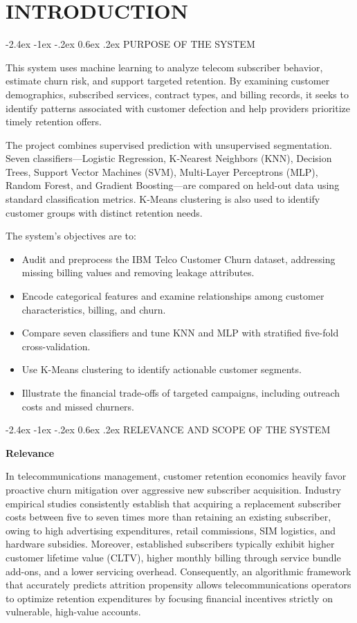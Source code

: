 \documentclass[12pt,oneside]{report}
\makeatletter
\renewcommand{\section}{\@startsection{section}{1}{\z@}%
  {-2.4ex \@plus -1ex \@minus -.2ex}%
  {0.6ex \@plus .2ex}%
  {\normalfont\large\bfseries}}
\newcommand{\chapterpage}[1]{\chapter{#1}}
\makeatother
\begin{document}
\setcounter{page}{1}

\chapterpage{INTRODUCTION}
\section{PURPOSE OF THE SYSTEM}

This system uses machine learning to analyze telecom subscriber behavior, estimate churn risk, and support targeted retention. By examining customer demographics, subscribed services, contract types, and billing records, it seeks to identify patterns associated with customer defection and help providers prioritize timely retention offers.

The project combines supervised prediction with unsupervised segmentation. Seven classifiers---Logistic Regression, K-Nearest Neighbors (KNN), Decision Trees, Support Vector Machines (SVM), Multi-Layer Perceptrons (MLP), Random Forest, and Gradient Boosting---are compared on held-out data using standard classification metrics. K-Means clustering is also used to identify customer groups with distinct retention needs.

The system's objectives are to:
\begin{itemize}
    \item Audit and preprocess the IBM Telco Customer Churn dataset, addressing missing billing values and removing leakage attributes.
    \item Encode categorical features and examine relationships among customer characteristics, billing, and churn.
    \item Compare seven classifiers and tune KNN and MLP with stratified five-fold cross-validation.
    \item Use K-Means clustering to identify actionable customer segments.
    \item Illustrate the financial trade-offs of targeted campaigns, including outreach costs and missed churners.
\end{itemize}

\newpage
\section{RELEVANCE AND SCOPE OF THE SYSTEM}

\textbf{Relevance}

In telecommunications management, customer retention economics heavily favor proactive churn mitigation over aggressive new subscriber acquisition. Industry empirical studies consistently establish that acquiring a replacement subscriber costs between five to seven times more than retaining an existing subscriber, owing to high advertising expenditures, retail commissions, SIM logistics, and hardware subsidies. Moreover, established subscribers typically exhibit higher customer lifetime value (CLTV), higher monthly billing through service bundle add-ons, and a lower servicing overhead. Consequently, an algorithmic framework that accurately predicts attrition propensity allows telecommunications operators to optimize retention expenditures by focusing financial incentives strictly on vulnerable, high-value accounts.
\end{document}
